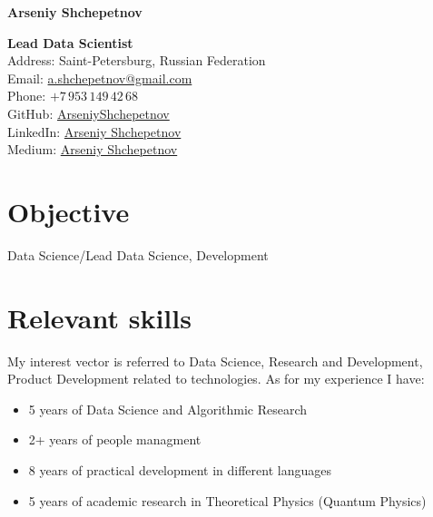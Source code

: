 \documentclass[10pt,a4paper]{article}
\newcommand{\vacancyName}{PhD student}
\begin{document}
	

	\raggedright{\Large{\textbf{Arseniy Shchepetnov}}}\\[0.3cm]
	
	\begin{minipage}[t]{0.7\textwidth}
		\vspace{0pt}
		\raggedright{\textbf{Lead Data Scientist}}\\[0.3cm]
		\noindent Address: Saint-Petersburg, Russian Federation \\[0.1cm]
		\noindent Email: \href{mailto:a.shchepetnov@gmail.com}{a.shchepetnov@gmail.com}\\[0.1cm]
		\noindent Phone: $+7\,953\,149\,42\,68$ \\
		\noindent GitHub: \href{https://github.com/ArseniyShchepetnov}{ArseniyShchepetnov}\\
            \noindent LinkedIn: \href{https://www.linkedin.com/in/arseniy-shchepetnov-4a236171/}{Arseniy Shchepetnov}\\
            \noindent Medium: \href{https://medium.com/@a.shchepetnov}{Arseniy Shchepetnov}
	\end{minipage}
	\begin{minipage}[t]{0.2\textwidth}
		\vspace{0pt}
	\end{minipage}
	
	
	\section*{Objective}
	
	Data Science/Lead Data Science, Development
	
	\section*{Relevant skills}
	
	\setlength{\parindent}{3em}

	
My interest vector is referred to Data Science, Research and Development, Product Development related to technologies.
As for my experience I have:
\begin{itemize}
    \item 5 years of Data Science and Algorithmic Research
    \item 2+ years of people managment
    \item 8 years of practical development in different languages
    \item 5 years of academic research in Theoretical Physics (Quantum Physics) 
\end{itemize}
\end{document}

